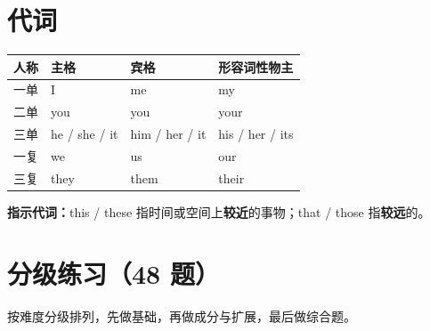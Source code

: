 \documentclass[11pt,a4paper]{ctexart}
\begin{document}
\section{代词}
\begin{center}
\begin{tabular}{p{2.6cm}p{3.0cm}p{3.0cm}p{4.0cm}}
\hline
\textbf{人称} & \textbf{主格} & \textbf{宾格} & \textbf{形容词性物主}\\
\hline
一单 & I & me & my\\
二单 & you & you & your\\
三单 & he / she / it & him / her / it & his / her / its\\
一复 & we & us & our\\
三复 & they & them & their\\
\hline
\end{tabular}
\end{center}
\textbf{指示代词：}this / these 指时间或空间上\textbf{较近}的事物；that / those 指\textbf{较远}的。


\newpage
\section{分级练习（48 题）}
\noindent 按难度分级排列，先做基础，再做成分与扩展，最后做综合题。
\end{document}
